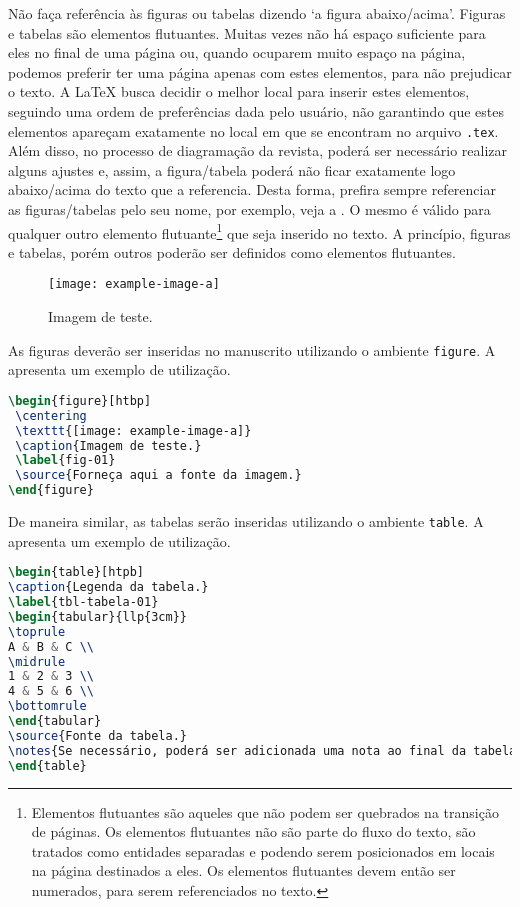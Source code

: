 \documentclass[portuguese]{textolivre}
\begin{document}
Não faça referência às figuras ou tabelas dizendo `a figura abaixo/acima'.
Figuras e tabelas são elementos flutuantes. Muitas vezes não há espaço suficiente para
eles no final de uma página ou, quando ocuparem muito espaço na página, podemos preferir
ter uma página apenas com estes elementos, para não prejudicar o texto.
A \LaTeX{} busca decidir o melhor local para inserir estes elementos, seguindo uma ordem
de preferências dada pelo usuário, não garantindo que estes elementos apareçam exatamente
no local em que se encontram no arquivo \verb|.tex|. Além disso, no processo de diagramação
da revista, poderá ser necessário realizar alguns ajustes e, assim, a figura/tabela poderá
não ficar exatamente logo abaixo/acima do texto que a referencia.
Desta forma, prefira sempre referenciar as figuras/tabelas pelo seu nome,
por exemplo, veja a . O mesmo é válido para qualquer outro elemento flutuante\footnote{
Elementos flutuantes são aqueles que não podem ser quebrados na transição de páginas.
Os elementos flutuantes não são parte do fluxo do texto, são tratados como entidades separadas
e podendo serem posicionados em locais na página destinados a eles. Os elementos flutuantes devem então
ser numerados, para serem referenciados no texto.
}
que seja inserido no texto. A princípio, figuras e tabelas, porém outros poderão ser definidos
como elementos flutuantes.

\begin{figure}[htbp]
 \centering
 \texttt{[image: example-image-a]}
 \caption{Imagem de teste.}
 \label{fig-img-a}
\end{figure}

As figuras deverão ser inseridas no manuscrito utilizando o ambiente \verb|figure|.
A  apresenta um exemplo de utilização.
\begin{lstlisting}[language=tex, label=lst-figure, caption={Inserindo uma figura.}]
\begin{figure}[htbp]
 \centering
 \texttt{[image: example-image-a]}
 \caption{Imagem de teste.}
 \label{fig-01}
 \source{Forneça aqui a fonte da imagem.}
\end{figure}
\end{lstlisting} %

\lipsum[12]

De maneira similar, as tabelas serão inseridas utilizando o ambiente \verb|table|.
A  apresenta um exemplo de utilização.
\begin{lstlisting}[language=tex, label=lst-table, caption={Inserindo uma tabela.}]
\begin{table}[htpb]
\caption{Legenda da tabela.}
\label{tbl-tabela-01}
\begin{tabular}{llp{3cm}}
\toprule 
A & B & C \\ 
\midrule
1 & 2 & 3 \\ 
4 & 5 & 6 \\ 
\bottomrule
\end{tabular}
\source{Fonte da tabela.}
\notes{Se necessário, poderá ser adicionada uma nota ao final da tabela.}
\end{table}
\end{lstlisting} %
\end{document}
